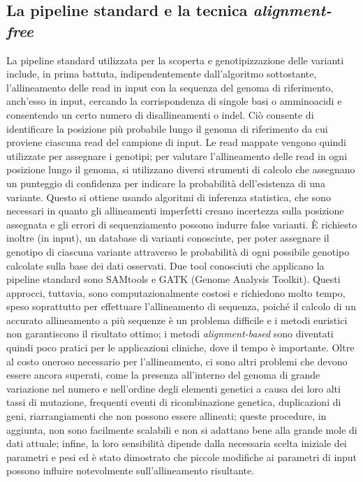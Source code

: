 \documentclass[../main.tex]{subfiles}
\begin{document}
\subsection{La pipeline standard e la tecnica \textit{alignment-free}}

La pipeline standard utilizzata per la scoperta e genotipizzazione delle varianti include, in prima battuta, indipendentemente dall'algoritmo sottostante, l'allineamento delle read in input con la sequenza del genoma di riferimento, anch'esso in input, cercando la corrispondenza di singole basi o amminoacidi e consentendo un certo numero di disallineamenti o indel. Ciò consente di identificare la posizione più probabile lungo il genoma di riferimento da cui proviene ciascuna read del campione di input. Le read mappate vengono quindi utilizzate per assegnare i genotipi; per valutare l'allineamento delle read in ogni posizione lungo il genoma, si utilizzano diversi strumenti di calcolo che assegnano un punteggio di confidenza per indicare la probabilità dell'esistenza di una variante. Questo si ottiene usando algoritmi di inferenza statistica, che sono necessari in quanto gli allineamenti imperfetti creano incertezza sulla posizione assegnata e gli errori di sequenziamento possono indurre false varianti. È richiesto inoltre (in input), un database di varianti conosciute, per poter assegnare il genotipo di ciascuna variante attraverso le probabilità di ogni possibile genotipo calcolate sulla base dei dati osservati. Due tool conosciuti che applicano la pipeline standard sono  SAMtools e GATK (Genome Analysis Toolkit)\cite{McKenna2010gatk}. Questi approcci, tuttavia, sono computazionalmente costosi e richiedono molto tempo, speso soprattutto per effettuare l'allineamento di sequenza, poiché il calcolo di un accurato allineamento a più sequenze è un problema difficile e i metodi euristici non garantiscono il risultato ottimo; i metodi \textit{alignment-based} sono diventati quindi poco pratici per le applicazioni cliniche, dove il tempo è importante. Oltre al costo oneroso necessario per l'allineamento, ci sono altri problemi che devono essere ancora superati, come la presenza all'interno del genoma di grande variazione nel numero e nell'ordine degli elementi genetici a causa dei loro alti tassi di mutazione, frequenti eventi di ricombinazione genetica, duplicazioni di geni, riarrangiamenti che non possono essere allineati; queste procedure, in aggiunta, non sono facilmente scalabili e non si adattano bene alla grande mole di dati attuale; infine, la loro sensibilità dipende dalla necessaria scelta iniziale dei parametri e pesi ed è stato dimostrato che piccole modifiche ai parametri di input possono influire notevolmente sull'allineamento risultante. \\
\end{document}
